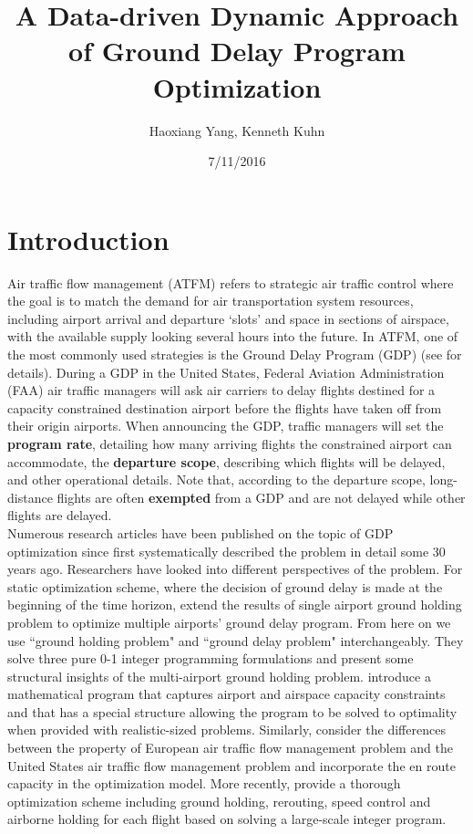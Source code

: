 \documentclass[12pt]{article}
\title{A Data-driven Dynamic Approach of Ground Delay Program Optimization}
\author{Haoxiang Yang, Kenneth Kuhn}
\date{7/11/2016}
\begin{document}
\maketitle

\section{Introduction} \label{Intro}
	Air traffic flow management (ATFM) refers to strategic air traffic control where the goal is to match the demand for air transportation system resources, including airport arrival and departure `slots' and space in sections of airspace, with the available supply looking several hours into the future.  In ATFM, one of the most commonly used strategies is the Ground Delay Program (GDP) (see \cite{ball2007air} for details).  During a GDP in the United States, Federal Aviation Administration (FAA) air traffic managers will ask air carriers to delay flights destined for a capacity constrained destination airport before the flights have taken off from their origin airports.  When announcing the GDP, traffic managers will set the {\bf program rate}, detailing how many arriving flights the constrained airport can accommodate, the {\bf departure scope}, describing which flights will be delayed, and other operational details.  Note that, according to the departure scope, long-distance flights are often {\bf exempted} from a GDP and are not delayed while other flights are delayed.\\
	\newline
	Numerous research articles have been published on the topic of GDP optimization since \cite{odoni} first systematically described the problem in detail some 30 years ago. Researchers have looked into different perspectives of the problem. For static optimization scheme, where the decision of ground delay is made at the beginning of the time horizon, \cite{vranas1994multi} extend the results of single airport ground holding problem to optimize multiple airports' ground delay program. From here on we use ``ground holding problem" and ``ground delay problem" interchangeably. They solve three pure 0-1 integer programming formulations and present some structural insights of the multi-airport ground holding problem. \cite{ssp} introduce a mathematical program that captures airport and airspace capacity constraints and that has a special structure allowing the program to be solved to optimality when provided with realistic-sized problems. Similarly, \cite{lulli2007european} consider the differences between the property of European air traffic flow management problem and the United States air traffic flow management problem and incorporate the en route capacity in the optimization model. More recently, \cite{bertsimas2011integer} provide a thorough optimization scheme including ground holding, rerouting, speed control and airborne holding for each flight based on solving a large-scale integer program.\\
\end{document}
